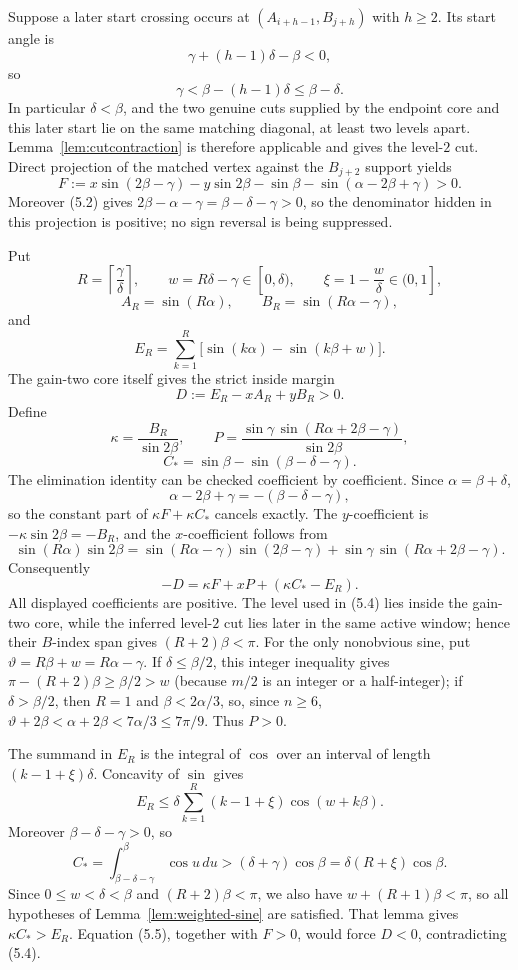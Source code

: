 \documentclass[11pt]{article}
\theoremstyle{remark}
\begin{document}
Suppose a later start crossing occurs at $(A_{i+h-1},B_{j+h})$ with $h\ge2$. Its start angle is
\[
\gamma+(h-1)\delta-\beta<0,
\]
so
\[
\gamma<\beta-(h-1)\delta\le\beta-\delta.
\tag{5.2}
\]
In particular $\delta<\beta$, and the two genuine cuts supplied by the endpoint core and this later start lie on the same matching diagonal, at least two levels apart. Lemma~\ref{lem:cutcontraction} is therefore applicable and gives the level-$2$ cut. Direct projection of the matched vertex against the $B_{j+2}$ support yields
\[
F:=x\sin(2\beta-\gamma)-y\sin2\beta-\sin\beta-\sin(\alpha-2\beta+\gamma)>0.
\tag{5.3}
\]
Moreover (5.2) gives $2\beta-\alpha-\gamma=\beta-\delta-\gamma>0$, so the denominator hidden in this projection is positive; no sign reversal is being suppressed.

Put
\[
R=\left\lceil\frac{\gamma}{\delta}\right\rceil,
\qquad w=R\delta-\gamma\in[0,\delta),
\qquad \xi=1-\frac{w}{\delta}\in(0,1],
\]
\[
A_R=\sin(R\alpha),\qquad B_R=\sin(R\alpha-\gamma),
\]
and
\[
E_R=\sum_{k=1}^{R}\bigl[\sin(k\alpha)-\sin(k\beta+w)\bigr].
\]
The gain-two core itself gives the strict inside margin
\[
D:=E_R-xA_R+yB_R>0.
\tag{5.4}
\]
Define
\[
\kappa=\frac{B_R}{\sin2\beta},\qquad
P=\frac{\sin\gamma\,\sin(R\alpha+2\beta-\gamma)}{\sin2\beta},
\]
\[
C_*=\sin\beta-\sin(\beta-\delta-\gamma).
\]
The elimination identity can be checked coefficient by coefficient. Since $\alpha=\beta+\delta$,
\[
\alpha-2\beta+\gamma=-(\beta-\delta-\gamma),
\]
so the constant part of $\kappa F+\kappa C_*$ cancels exactly. The $y$-coefficient is $-\kappa\sin2\beta=-B_R$, and the $x$-coefficient follows from
\[
\sin(R\alpha)\sin2\beta
=\sin(R\alpha-\gamma)\sin(2\beta-\gamma)
 +\sin\gamma\,\sin(R\alpha+2\beta-\gamma).
\]
Consequently
\[
\boxed{-D=\kappa F+xP+(\kappa C_*-E_R).}
\tag{5.5}
\]
All displayed coefficients are positive. The level used in (5.4) lies inside the gain-two core, while the inferred level-$2$ cut lies later in the same active window; hence their $B$-index span gives $(R+2)\beta<\pi$. For the only nonobvious sine, put $\vartheta=R\beta+w=R\alpha-\gamma$. If $\delta\le\beta/2$, this integer inequality gives $\pi-(R+2)\beta\ge\beta/2>w$ (because $m/2$ is an integer or a half-integer); if $\delta>\beta/2$, then $R=1$ and $\beta<2\alpha/3$, so, since $n\ge6$, $\vartheta+2\beta<\alpha+2\beta<7\alpha/3\le7\pi/9$. Thus $P>0$.

The summand in $E_R$ is the integral of $\cos$ over an interval of length $(k-1+\xi)\delta$. Concavity of $\sin$ gives
\[
E_R\le\delta\sum_{k=1}^{R}(k-1+\xi)\cos(w+k\beta).
\]
Moreover $\beta-\delta-\gamma>0$, so
\[
C_*=\int_{\beta-\delta-\gamma}^{\beta}\cos u\,du
>(\delta+\gamma)\cos\beta
=\delta(R+\xi)\cos\beta.
\]
Since $0\le w<\delta<\beta$ and $(R+2)\beta<\pi$, we also have $w+(R+1)\beta<\pi$, so all hypotheses of Lemma~\ref{lem:weighted-sine} are satisfied. That lemma gives $\kappa C_*>E_R$. Equation (5.5), together with $F>0$, would force $D<0$, contradicting (5.4).
\end{document}
